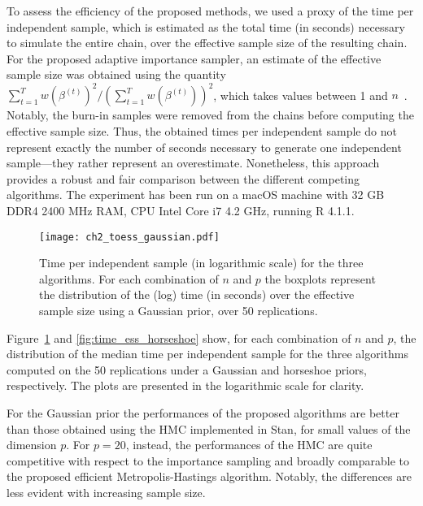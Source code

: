 To assess the efficiency of the proposed methods, we used a proxy of the time per independent sample, which is estimated as the total time (in seconds) necessary to simulate the entire chain, over the effective sample size of the resulting chain. For the proposed adaptive importance sampler, an estimate of the effective sample size was obtained using the quantity $\sum_{t=1}^T w(\beta^{(t)})^2 / (\sum_{t=1}^T w(\beta^{(t)}))^2$, which takes values between 1 and $n$~\parencite{robert2010}. 
Notably, the burn-in samples were removed from the chains before computing the effective sample size. Thus, the obtained times per independent sample  do not represent exactly the number of seconds necessary to generate one independent sample---they rather represent an overestimate. Nonetheless, this approach provides a robust and fair comparison between the different competing algorithms. The experiment has been run on a macOS machine with 32 GB DDR4 2400 MHz RAM, CPU Intel Core i7 4.2 GHz, running R 4.1.1.
%
\begin{figure}[h]
	\begin{center}
		\texttt{[image: ch2\_toess\_gaussian.pdf]}
		\caption[Comparison between the time per independent sample of the proposed algorithms and of the HMC algorithm.]{Time per independent sample (in logarithmic scale) for the three algorithms. For each combination of $n$ and $p$ the boxplots represent the distribution of the (log) time (in seconds) over the effective sample size using a Gaussian prior, over 50 replications.
		\label{fig:time_ess}}
	\end{center}
\end{figure}

Figure~\ref{fig:time_ess} and \ref{fig:time_ess_horseshoe} show, for each combination of $n$ and $p$, the distribution of the median time per independent sample for the three algorithms computed on the 50 replications under a Gaussian and horseshoe priors, respectively. The plots are presented in the logarithmic scale for clarity. 

For the Gaussian prior the performances of the proposed algorithms are better than those obtained using the HMC implemented in Stan, for small values of the dimension $p$. For $p=20$, instead, the performances of the HMC are quite competitive with respect to the importance sampling and broadly comparable to the proposed efficient Metropolis-Hastings algorithm. Notably, the differences are less evident with increasing sample size. 

